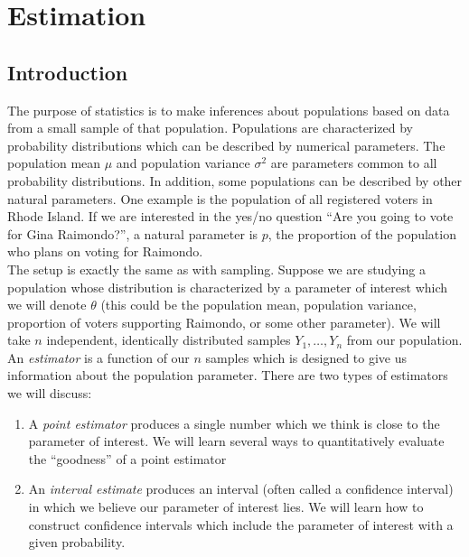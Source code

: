 \documentclass[12pt]{article}
\theoremstyle{definition}
\theoremstyle{remark}
\begin{document}
\setcounter{section}{5}
\section{Estimation}

\subsection{Introduction}
The purpose of statistics is to make inferences about populations based on data from a small sample of that population. Populations are characterized by probability distributions which can be described by numerical parameters. The population mean $\mu$ and population variance $\sigma^2$ are parameters common to all probability distributions. In addition, some populations can be described by other natural parameters. One example is the population of all registered voters in Rhode Island. If we are interested in the yes/no question ``Are you going to vote for Gina Raimondo?'', a natural parameter is $p$, the proportion of the population who plans on voting for Raimondo.\\

The setup is exactly the same as with sampling. Suppose we are studying a population whose distribution is characterized by a parameter of interest which we will denote $\theta$ (this could be the population mean, population variance, proportion of voters supporting Raimondo, or some other parameter). We will take $n$ independent, identically distributed samples $Y_1, \dots, Y_n$ from our population. An \emph{estimator} is a function of our $n$ samples which is designed to give us information about the population parameter. There are two types of estimators we will discuss:
\begin{enumerate}
\item A \emph{point estimator} produces a single number which we think is close to the parameter of interest. We will learn several ways to quantitatively evaluate the ``goodness'' of a point estimator
\item An \emph{interval estimate} produces an interval (often called a confidence interval) in which we believe our parameter of interest lies. We will learn how to construct confidence intervals which include the parameter of interest with a given probability.
\end{enumerate}
\end{document}
